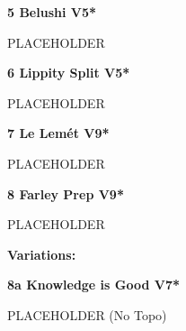 	\begin{multicols}{2}


\needspace{1.5cm}
\label{rt:Belushi}
\colorbox{RoyalBlue!20}{
\parbox{0.95\linewidth}{
\textbf{
5 Belushi V5*  
}}}
\begin{adjustwidth}{0.5cm}{}			
PLACEHOLDER
\end{adjustwidth}




\needspace{1.5cm}
\label{rt:Lippity Split}
\colorbox{RoyalBlue!20}{
\parbox{0.95\linewidth}{
\textbf{
6 Lippity Split V5*  
}}}
\begin{adjustwidth}{0.5cm}{}			
PLACEHOLDER
\end{adjustwidth}




\needspace{1.5cm}
\label{rt:Le Lemét}
\colorbox{Goldenrod!50}{
\parbox{0.95\linewidth}{
\textbf{
7 Le Lemét V9*  
}}}
\begin{adjustwidth}{0.5cm}{}			
PLACEHOLDER
\end{adjustwidth}




\needspace{1.5cm}
\label{rt:Farley Prep}
\colorbox{Goldenrod!50}{
\parbox{0.95\linewidth}{
\textbf{
8 Farley Prep V9*  
}}}
\begin{adjustwidth}{0.5cm}{}			
PLACEHOLDER
\end{adjustwidth}


\begin{adjustwidth}{0.5cm}{}				
\needspace{3cm}
\textbf{Variations:} \newline

\needspace{1.5cm}
\label{vr:Knowledge is Good}
\colorbox{Goldenrod!50}{
\parbox{0.95\linewidth}{
\textbf{
8a Knowledge is Good V7*  
}}}
\begin{adjustwidth}{0.5cm}{}			
PLACEHOLDER
  (No Topo)
\end{adjustwidth}



\end{adjustwidth}




\end{multicols}
\clearpage